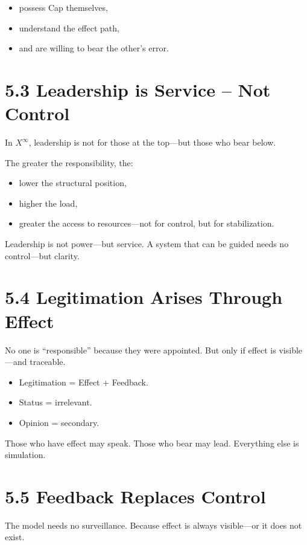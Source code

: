 \documentclass[12pt,a4paper]{book}
\begin{document}
\begin{itemize}
    \item possess Cap themselves,
    \item understand the effect path,
    \item and are willing to bear the other’s error.
\end{itemize}

\section*{5.3 Leadership is Service – Not Control}

In $X^\infty$, leadership is not for those at the top—but those who bear below.

The greater the responsibility, the:

\begin{itemize}
    \item lower the structural position,
    \item higher the load,
    \item greater the access to resources—not for control, but for stabilization.
\end{itemize}

Leadership is not power—but service.  
A system that can be guided needs no control—but clarity.

\section*{5.4 Legitimation Arises Through Effect}

No one is “responsible” because they were appointed.  
But only if effect is visible—and traceable.

\begin{itemize}
    \item Legitimation = Effect + Feedback.
    \item Status = irrelevant.
    \item Opinion = secondary.
\end{itemize}

Those who have effect may speak. Those who bear may lead.  
Everything else is simulation.

\section*{5.5 Feedback Replaces Control}

The model needs no surveillance.  
Because effect is always visible—or it does not exist.
\end{document}
